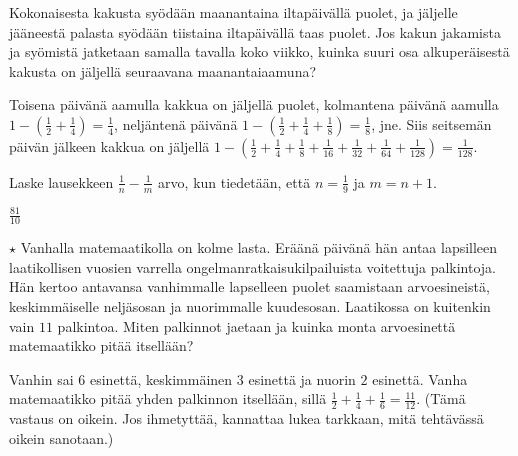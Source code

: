 \begin{tehtavasivu}
\begin{tehtava}
	Kokonaisesta kakusta syödään maanantaina iltapäivällä puolet, ja jäljelle jääneestä palasta syödään tiistaina iltapäivällä taas puolet. Jos kakun jakamista ja syömistä jatketaan samalla tavalla koko viikko, kuinka suuri osa alkuperäisestä kakusta on jäljellä seuraavana maanantaiaamuna?
	\begin{vastaus}
		Toisena päivänä aamulla kakkua on jäljellä puolet, kolmantena päivänä aamulla
		$1-\left(\frac{1}{2} + \frac{1}{4}\right) = \frac{1}{4}$, 
		neljäntenä päivänä
		$1-\left(\frac{1}{2} + \frac{1}{4} + \frac{1}{8}\right)
		= \frac{1}{8}$, jne.
		Siis seitsemän päivän jälkeen kakkua on jäljellä
		$1-\left(\frac{1}{2} + \frac{1}{4} + \frac{1}{8} +
		\frac{1}{16} + \frac{1}{32} + \frac{1}{64} + \frac{1}{128}\right)
		= \frac{1}{128}$.  
	\end{vastaus}
\end{tehtava}

\begin{tehtava}
	Laske lausekkeen $\frac{1}{n}-\frac{1}{m}$ arvo, kun tiedetään, että $n = \frac{1}{9}$ ja $m=n+1$.
	\begin{vastaus}
		$\frac{81}{10}$
	\end{vastaus}
\end{tehtava}

\begin{tehtava}
	$\star$ Vanhalla matemaatikolla on kolme lasta. Eräänä päivänä hän antaa lapsilleen laatikollisen vuosien varrella ongelmanratkaisukilpailuista voitettuja palkintoja. Hän kertoo antavansa vanhimmalle lapselleen puolet saamistaan arvoesineistä, keskimmäiselle neljäsosan ja nuorimmalle kuudesosan. Laatikossa on kuitenkin vain $11$ palkintoa. Miten  palkinnot jaetaan ja kuinka monta arvoesinettä matemaatikko pitää itsellään?
	\begin{vastaus}
		Vanhin sai $6$ esinettä, keskimmäinen $3$ esinettä ja nuorin $2$ esinettä. Vanha matemaatikko pitää yhden palkinnon itsellään, sillä $\frac{1}{2} + \frac{1}{4} + \frac{1}{6} = \frac{11}{12}$. (Tämä vastaus on oikein. Jos ihmetyttää, kannattaa lukea tarkkaan, mitä tehtävässä oikein sanotaan.)
	\end{vastaus}
\end{tehtava}

\end{tehtavasivu}